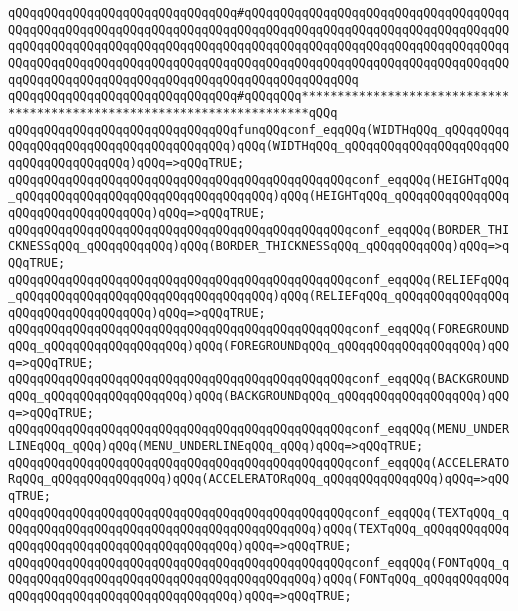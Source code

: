 \verb|qQQqqQQqqQQqqQQqqQQqqQQqqQQqqQQq#qQQqqQQqqQQqqQQqqQQqqQQqqQQqqQQqqQQqqQQqqQQqqQQqqQQqqQQqqQQqqQQqqQQqqQQqqQQqqQQqqQQqqQQqqQQqqQQqqQQqqQQqqQQqqQQqqQQqqQQqqQQqqQQqqQQqqQQqqQQqqQQqqQQqqQQqqQQqqQQqqQQqqQQqqQQqqQQqqQQqqQQqqQQqqQQqqQQqqQQqqQQqqQQqqQQqqQQqqQQqqQQqqQQqqQQqqQQqqQQqqQQqqQQqqQQqqQQqqQQqqQQqqQQqqQQqqQQqqQQqqQQqqQQqqQQqqQQq|\newline
\verb|qQQqqQQqqQQqqQQqqQQqqQQqqQQqqQQq#qQQqqQQq***********************************************************************qQQq|\newline
\newline
\verb|qQQqqQQqqQQqqQQqqQQqqQQqqQQqqQQqfunqQQqconf_eqqQQq(WIDTHqQQq_qQQqqQQqqQQqqQQqqQQqqQQqqQQqqQQqqQQqqQQq)qQQq(WIDTHqQQq_qQQqqQQqqQQqqQQqqQQqqQQqqQQqqQQqqQQqqQQq)qQQq=>qQQqTRUE;|\newline
\verb|qQQqqQQqqQQqqQQqqQQqqQQqqQQqqQQqqQQqqQQqqQQqqQQqconf_eqqQQq(HEIGHTqQQq_qQQqqQQqqQQqqQQqqQQqqQQqqQQqqQQqqQQq)qQQq(HEIGHTqQQq_qQQqqQQqqQQqqQQqqQQqqQQqqQQqqQQqqQQq)qQQq=>qQQqTRUE;|\newline
\verb|qQQqqQQqqQQqqQQqqQQqqQQqqQQqqQQqqQQqqQQqqQQqqQQqconf_eqqQQq(BORDER_THICKNESSqQQq_qQQqqQQqqQQq)qQQq(BORDER_THICKNESSqQQq_qQQqqQQqqQQq)qQQq=>qQQqTRUE;|\newline
\verb|qQQqqQQqqQQqqQQqqQQqqQQqqQQqqQQqqQQqqQQqqQQqqQQqconf_eqqQQq(RELIEFqQQq_qQQqqQQqqQQqqQQqqQQqqQQqqQQqqQQqqQQq)qQQq(RELIEFqQQq_qQQqqQQqqQQqqQQqqQQqqQQqqQQqqQQqqQQq)qQQq=>qQQqTRUE;|\newline
\verb|qQQqqQQqqQQqqQQqqQQqqQQqqQQqqQQqqQQqqQQqqQQqqQQqconf_eqqQQq(FOREGROUNDqQQq_qQQqqQQqqQQqqQQqqQQq)qQQq(FOREGROUNDqQQq_qQQqqQQqqQQqqQQqqQQq)qQQq=>qQQqTRUE;|\newline
\verb|qQQqqQQqqQQqqQQqqQQqqQQqqQQqqQQqqQQqqQQqqQQqqQQqconf_eqqQQq(BACKGROUNDqQQq_qQQqqQQqqQQqqQQqqQQq)qQQq(BACKGROUNDqQQq_qQQqqQQqqQQqqQQqqQQq)qQQq=>qQQqTRUE;|\newline
\verb|qQQqqQQqqQQqqQQqqQQqqQQqqQQqqQQqqQQqqQQqqQQqqQQqconf_eqqQQq(MENU_UNDERLINEqQQq_qQQq)qQQq(MENU_UNDERLINEqQQq_qQQq)qQQq=>qQQqTRUE;|\newline
\verb|qQQqqQQqqQQqqQQqqQQqqQQqqQQqqQQqqQQqqQQqqQQqqQQqconf_eqqQQq(ACCELERATORqQQq_qQQqqQQqqQQqqQQq)qQQq(ACCELERATORqQQq_qQQqqQQqqQQqqQQq)qQQq=>qQQqTRUE;|\newline
\verb|qQQqqQQqqQQqqQQqqQQqqQQqqQQqqQQqqQQqqQQqqQQqqQQqconf_eqqQQq(TEXTqQQq_qQQqqQQqqQQqqQQqqQQqqQQqqQQqqQQqqQQqqQQqqQQq)qQQq(TEXTqQQq_qQQqqQQqqQQqqQQqqQQqqQQqqQQqqQQqqQQqqQQqqQQq)qQQq=>qQQqTRUE;|\newline
\verb|qQQqqQQqqQQqqQQqqQQqqQQqqQQqqQQqqQQqqQQqqQQqqQQqconf_eqqQQq(FONTqQQq_qQQqqQQqqQQqqQQqqQQqqQQqqQQqqQQqqQQqqQQqqQQq)qQQq(FONTqQQq_qQQqqQQqqQQqqQQqqQQqqQQqqQQqqQQqqQQqqQQqqQQq)qQQq=>qQQqTRUE;|\newline
